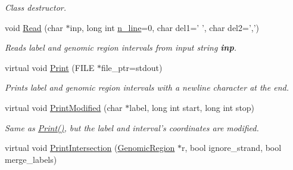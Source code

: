 \begin{CompactItemize}
\begin{CompactList}\small\item\em Class destructor. \item\end{CompactList}\item 
\hypertarget{classGenomicRegion_fd188daab9b4e97ef66883d6971fe103}{
void \hyperlink{classGenomicRegion_fd188daab9b4e97ef66883d6971fe103}{Read} (char $\ast$inp, long int \hyperlink{classGenomicRegion_efe2255aeed5338060190ded05cb9c0c}{n\_\-line}=0, char del1=' ', char del2=',')}
\label{classGenomicRegion_fd188daab9b4e97ef66883d6971fe103}

\begin{CompactList}\small\item\em Reads label and genomic region intervals from input string {\bf inp}. \item\end{CompactList}\item 
\hypertarget{classGenomicRegion_40397d1fab7b00e5f04b9f7e52f0114e}{
virtual void \hyperlink{classGenomicRegion_40397d1fab7b00e5f04b9f7e52f0114e}{Print} (FILE $\ast$file\_\-ptr=stdout)}
\label{classGenomicRegion_40397d1fab7b00e5f04b9f7e52f0114e}

\begin{CompactList}\small\item\em Prints label and genomic region intervals with a newline character at the end. \item\end{CompactList}\item 
\hypertarget{classGenomicRegion_b9ea31af7fbb32f206efe0e64533a5be}{
virtual void \hyperlink{classGenomicRegion_b9ea31af7fbb32f206efe0e64533a5be}{PrintModified} (char $\ast$label, long int start, long int stop)}
\label{classGenomicRegion_b9ea31af7fbb32f206efe0e64533a5be}

\begin{CompactList}\small\item\em Same as \hyperlink{classGenomicRegion_40397d1fab7b00e5f04b9f7e52f0114e}{Print()}, but the label and interval's coordinates are modified. \item\end{CompactList}\item 
\hypertarget{classGenomicRegion_ba987d40590874eebd1dd8bb0c02bdc8}{
virtual void \hyperlink{classGenomicRegion_ba987d40590874eebd1dd8bb0c02bdc8}{PrintIntersection} (\hyperlink{classGenomicRegion}{GenomicRegion} $\ast$r, bool ignore\_\-strand, bool merge\_\-labels)}
\label{classGenomicRegion_ba987d40590874eebd1dd8bb0c02bdc8}


\end{CompactItemize}
